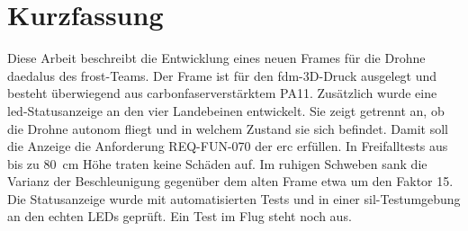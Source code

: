 \chapter*{Kurzfassung}
\label{ch:Kurzfassung}

Diese Arbeit beschreibt die Entwicklung eines neuen Frames für die Drohne \gls{daedalus} des \gls{frost}-Teams. Der Frame ist für den \gls{fdm}-3D-Druck ausgelegt und besteht überwiegend aus carbonfaserverstärktem PA11. Zusätzlich wurde eine \gls{led}-Statusanzeige an den vier Landebeinen entwickelt. Sie zeigt getrennt an, ob die Drohne autonom fliegt und in welchem Zustand sie sich befindet. Damit soll die Anzeige die Anforderung REQ-FUN-070 der \gls{erc} erfüllen. In Freifalltests aus bis zu \SI{80}{\centi\metre} Höhe traten keine Schäden auf. Im ruhigen Schweben sank die Varianz der Beschleunigung gegenüber dem alten Frame etwa um den Faktor 15. Die Statusanzeige wurde mit automatisierten Tests und in einer \gls{sil}-Testumgebung an den echten LEDs geprüft. Ein Test im Flug steht noch aus.
